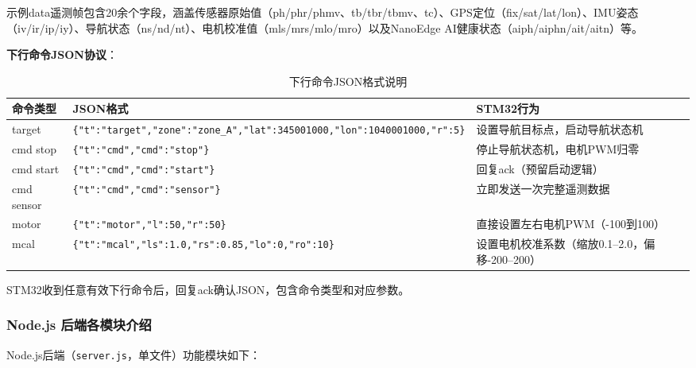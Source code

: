 \documentclass[12pt,a4paper]{ctexart}
\begin{document}
示例data遥测帧包含20余个字段，涵盖传感器原始值（ph/phr/phmv、tb/tbr/tbmv、tc）、GPS定位（fix/sat/lat/lon）、IMU姿态（iv/ir/ip/iy）、导航状态（ns/nd/nt）、电机校准值（mls/mrs/mlo/mro）以及NanoEdge AI健康状态（aiph/aiphn/ait/aitn）等。

\textbf{下行命令JSON协议}：

\begin{table}[H]
\centering
\caption{下行命令JSON格式说明}
\label{tab:downlink}
\begin{tabular}{p{2.8cm}p{7.5cm}p{3.5cm}}
\toprule
\textbf{命令类型} & \textbf{JSON格式} & \textbf{STM32行为} \\
\midrule
target & \texttt{\{"t":"target","zone":"zone\_A","lat":345001000,"lon":1040001000,"r":5\}} & 设置导航目标点，启动导航状态机 \\
\hline
cmd stop & \texttt{\{"t":"cmd","cmd":"stop"\}} & 停止导航状态机，电机PWM归零 \\
cmd start & \texttt{\{"t":"cmd","cmd":"start"\}} & 回复ack（预留启动逻辑） \\
cmd sensor & \texttt{\{"t":"cmd","cmd":"sensor"\}} & 立即发送一次完整遥测数据 \\
\hline
motor & \texttt{\{"t":"motor","l":50,"r":50\}} & 直接设置左右电机PWM（-100到100） \\
\hline
mcal & \texttt{\{"t":"mcal","ls":1.0,"rs":0.85,"lo":0,"ro":10\}} & 设置电机校准系数（缩放0.1--2.0，偏移-200--200） \\
\bottomrule
\end{tabular}
\end{table}

STM32收到任意有效下行命令后，回复ack确认JSON，包含命令类型和对应参数。

\subsubsection{Node.js 后端各模块介绍}

Node.js后端（\texttt{server.js}，单文件）功能模块如下：
\end{document}
